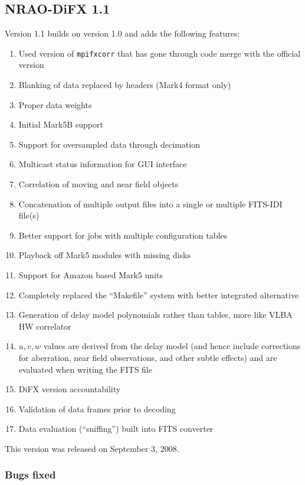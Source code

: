 \subsection{NRAO-DiFX 1.1}

Version 1.1 builds on version 1.0 and adds the following features:
\begin{enumerate}
\item Used version of {\tt mpifxcorr} that has gone through code merge with the official version
\item Blanking of data replaced by headers (Mark4 format only)
\item Proper data weights
\item Initial Mark5B support
\item Support for oversampled data through decimation
\item Multicast status information for GUI interface
\item Correlation of moving and near field objects
\item Concatenation of multiple output files into a single or multiple FITS-IDI file(s)
\item Better support for jobs with multiple configuration tables
\item Playback off Mark5 modules with missing disks
\item Support for Amazon based Mark5 units
\item Completely replaced the ``Makefile'' system with better integrated alternative
\item Generation of delay model polynomials rather than tables, more like VLBA HW correlator
\item $u, v, w$ values are derived from the delay model (and hence include corrections for aberration, near field observations, and other subtle effects) and are evaluated when writing the FITS file
\item DiFX version accountability
\item Validation of data frames prior to decoding
\item Data evaluation (``sniffing'') built into FITS converter
\end{enumerate}
This version was released on September 3, 2008.

\subsubsection{Bugs fixed}

